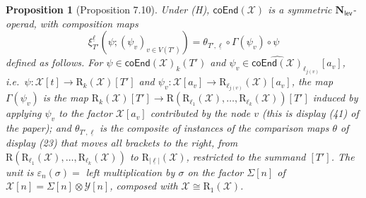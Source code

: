 \documentclass[12pt]{article}
\theoremstyle{plain}
\newtheorem{cproposition}[ctheorem]{Proposition}
\theoremstyle{definition}
\theoremstyle{remark}
\newcommand{\Cal}[1]{\mathcal{#1}}
\newcommand{\Nl}{\mathbf{N}_{\mathsf{lev}}}
\newcommand{\coend}[1]{\mathsf{coEnd}(#1)}
\newcommand{\Rr}{\mathrm{R}}
\begin{document}
\begin{cproposition}[Proposition 7.10]\label{cprop:coend}
Under (H), $\coend{\Cal X}$ is a symmetric $\Nl$-operad, with composition maps
\[\xi^{\underline\ell}_{T'}(\psi;(\psi_v)_{v\in V(T')})=\theta_{T',\underline\ell}\circ\Gamma(\psi_v)\circ\psi\]
defined as follows. For $\psi\in\coend{\Cal X}_k(T')$ and $\psi_v\in\widehat{\coend{\Cal X}}_{\ell_{j(v)}}[a_v]$, i.e.\ $\psi\colon\Cal X[t]\to\Rr_k(\Cal X)[T']$ and $\psi_v\colon\Cal X[a_v]\to\Rr_{\ell_{j(v)}}(\Cal X)[a_v]$, the map $\Gamma(\psi_v)$ is the map $\Rr_k(\Cal X)[T']\to\Rr(\Rr_{\ell_1}(\Cal X),\dots,\Rr_{\ell_k}(\Cal X))[T']$ induced by applying $\psi_v$ to the factor $\Cal X[a_v]$ contributed by the node $v$ (this is display (41) of the paper); and $\theta_{T',\underline\ell}$ is the composite of instances of the comparison maps $\theta$ of display (23) that moves all brackets to the right, from $\Rr(\Rr_{\ell_1}(\Cal X),\dots,\Rr_{\ell_k}(\Cal X))$ to $\Rr_{|\underline\ell|}(\Cal X)$, restricted to the summand $[T']$. The unit is $\varepsilon_n(\sigma)=$ left multiplication by $\sigma$ on the factor $\Sigma[n]$ of $\Cal X[n]=\Sigma[n]\otimes\Cal Y[n]$, composed with $\Cal X\cong\Rr_1(\Cal X)$.
\end{cproposition}
\end{document}
